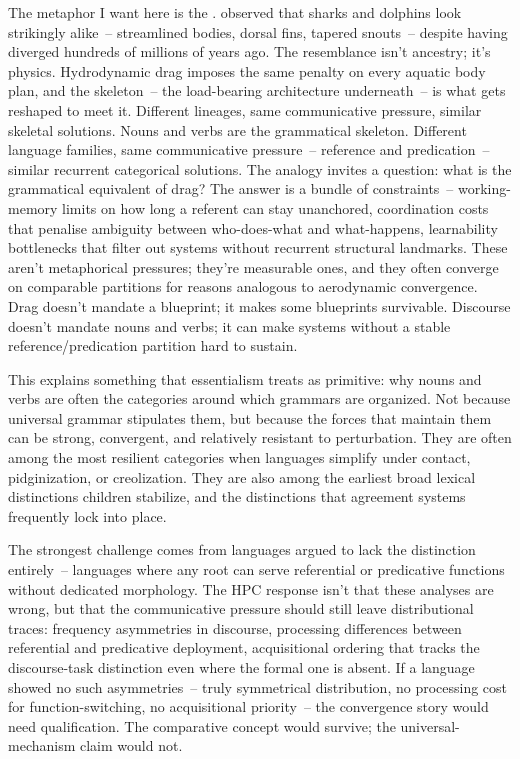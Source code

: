 The metaphor I want here is the . \textcite{zimmer2015} observed that sharks and dolphins look strikingly alike~-- streamlined bodies, dorsal fins, tapered snouts~-- despite having diverged hundreds of millions of years ago. The resemblance isn't ancestry; it's physics. Hydrodynamic drag imposes the same penalty on every aquatic body plan, and the skeleton~-- the load-bearing architecture underneath~-- is what gets reshaped to meet it. Different lineages, same communicative pressure, similar skeletal solutions. Nouns and verbs are the grammatical skeleton. Different language families, same communicative pressure~-- reference and predication~-- similar recurrent categorical solutions. The analogy invites a question: what is the grammatical equivalent of drag? The answer is a bundle of constraints~-- working-memory limits on how long a referent can stay unanchored, coordination costs that penalise ambiguity between who-does-what and what-happens, learnability bottlenecks that filter out systems without recurrent structural landmarks. These aren't metaphorical pressures; they're measurable ones, and they often converge on comparable partitions for reasons analogous to aerodynamic convergence. Drag doesn't mandate a blueprint; it makes some blueprints survivable. Discourse doesn't mandate nouns and verbs; it can make systems without a stable reference/predication partition hard to sustain.

This explains something that essentialism treats as primitive: why nouns and verbs are often the categories around which grammars are organized. Not because universal grammar stipulates them, but because the forces that maintain them can be strong, convergent, and relatively resistant to perturbation. They are often among the most resilient categories when languages simplify under contact, pidginization, or creolization. They are also among the earliest broad lexical distinctions children stabilize, and the distinctions that agreement systems frequently lock into place.

The strongest challenge comes from languages argued to lack the distinction entirely~-- languages where any root can serve referential or predicative functions without dedicated morphology. The HPC response isn't that these analyses are wrong, but that the communicative pressure should still leave distributional traces: frequency asymmetries in discourse, processing differences between referential and predicative deployment, acquisitional ordering that tracks the discourse-task distinction even where the formal one is absent. If a language showed no such asymmetries~-- truly symmetrical distribution, no processing cost for function-switching, no acquisitional priority~-- the convergence story would need qualification. The comparative concept would survive; the universal-mechanism claim would not.

